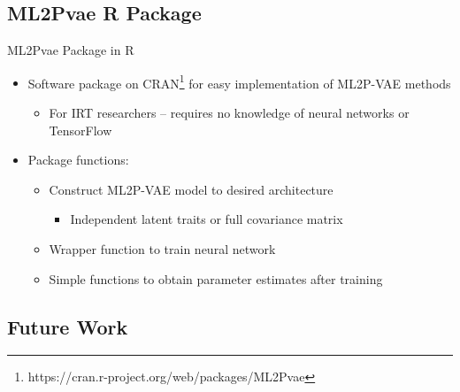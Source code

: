 \documentclass{beamer}
\theoremstyle{definition}
\begin{document}
%

\subsection{ML2Pvae R Package}
\begin{frame}{ML2Pvae Package in R}
\begin{itemize}
  \item Software package on CRAN\footnote{https://cran.r-project.org/web/packages/ML2Pvae} for easy implementation of ML2P-VAE methods
    \begin{itemize}
      \item For IRT researchers -- requires no knowledge of neural networks or TensorFlow
    \end{itemize}
  \item<2-> Package functions:
  \begin{itemize}
    \item<2-> Construct ML2P-VAE model to desired architecture
      \begin{itemize}
        \item<2-> Independent latent traits or full covariance matrix
      \end{itemize}
    \item<2-> Wrapper function to train neural network
    \item<2-> Simple functions to obtain parameter estimates after training
  \end{itemize}
\end{itemize}
\end{frame}


\subsection{Future Work}
\end{document}
